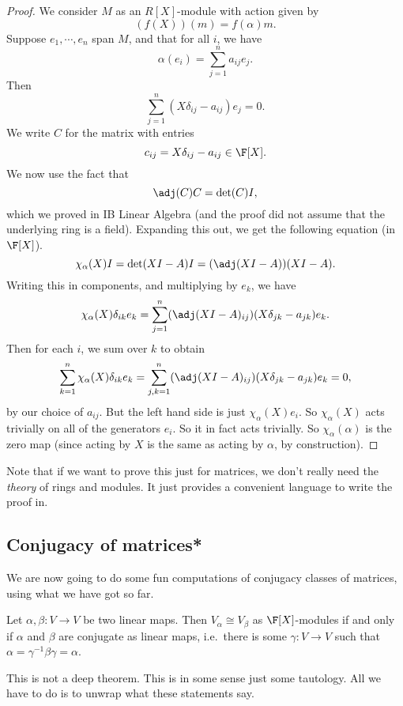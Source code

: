 \documentclass[a4paper]{article}
\begin{document}
\begin{proof}
  We consider $M$ as an $R[X]$-module with action given by
  \[
    (f(X))(m) = f(\alpha) m.
  \]
  Suppose $e_1, \cdots, e_n$ span $M$, and that for all $i$, we have
  \[
    \alpha(e_i) = \sum_{j = 1}^n a_{ij} e_j.
  \]
  Then
  \[
    \sum_{j = 1}^n (X \delta_{ij} - a_{ij}) e_j = 0.
  \]
  We write $C$ for the matrix with entries
  \[
    c_{ij} = X \delta_{ij} - a_{ij} \in \F[X].
  \]
  We now use the fact that
  \[
    \adj(C) C = \det(C) I,
  \]
  which we proved in IB Linear Algebra (and the proof did not assume that the underlying ring is a field). Expanding this out, we get the following equation (in $\F[X]$).
  \[
    \chi_\alpha (X) I = \det(XI - A) I = (\adj(XI - A)) (XI - A).
  \]
  Writing this in components, and multiplying by $e_k$, we have
  \[
    \chi_\alpha(X) \delta_{ik}e_k = \sum_{j = 1}^n (\adj(XI - A)_{ij}) (X \delta_{jk} - a_{jk}) e_k.
  \]
  Then for each $i$, we sum over $k$ to obtain
  \[
    \sum_{k = 1}^n \chi_\alpha(X) \delta_{ik} e_k = \sum_{j, k = 1}^n (\adj(XI - A)_{ij}) (X \delta_{jk} - a_{jk}) e_k = 0,
  \]
  by our choice of $a_{ij}$. But the left hand side is just $\chi_{\alpha}(X) e_i$. So $\chi_\alpha(X)$ acts trivially on all of the generators $e_i$. So it in fact acts trivially. So $\chi_\alpha(\alpha)$ is the zero map (since acting by $X$ is the same as acting by $\alpha$, by construction).
\end{proof}
Note that if we want to prove this just for matrices, we don't really need the \emph{theory} of rings and modules. It just provides a convenient language to write the proof in.

\subsection{Conjugacy of matrices*}
We are now going to do some fun computations of conjugacy classes of matrices, using what we have got so far.
\begin{lemma}
  Let $\alpha, \beta: V \to V$ be two linear maps. Then $V_\alpha\cong V_\beta$ as $\F[X]$-modules if and only if $\alpha$ and $\beta$ are conjugate as linear maps, i.e.\ there is some $\gamma: V \to V$ such that $\alpha = \gamma^{-1}\beta\gamma = \alpha$.
\end{lemma}
This is not a deep theorem. This is in some sense just some tautology. All we have to do is to unwrap what these statements say.
\end{document}
